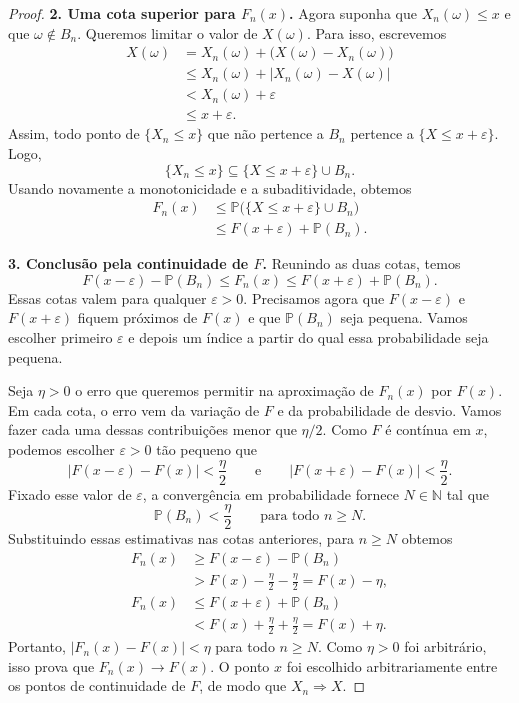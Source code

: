 \documentclass[12pt,portuguese]{article}
\theoremstyle{definition}
\theoremstyle{plainexercise}
\theoremstyle{starredexercise}
\theoremstyle{definition}
\begin{document}
\begin{proof}
\smallskip
\noindent\textbf{2. Uma cota superior para $F_n(x)$.}
Agora suponha que $X_n(\omega)\leqslant x$ e que $\omega\notin B_n$.
Queremos limitar o valor de $X(\omega)$. Para isso, escrevemos
\begin{align*}
X(\omega)
&=X_n(\omega)+\bigl(X(\omega)-X_n(\omega)\bigr)
\\
&\leqslant X_n(\omega)+|X_n(\omega)-X(\omega)|
\\
&<X_n(\omega)+\varepsilon
\\
&\leqslant x+\varepsilon.
\end{align*}
Assim, todo ponto de $\{X_n\leqslant x\}$ que não pertence a $B_n$ pertence a
$\{X\leqslant x+\varepsilon\}$. Logo,
\[
\{X_n\leqslant x\}
\subseteq
\{X\leqslant x+\varepsilon\}\cup B_n.
\]
Usando novamente a monotonicidade e a subaditividade, obtemos
\begin{align*}
F_n(x)
&\leqslant\mathbb{P}\bigl(\{X\leqslant x+\varepsilon\}\cup B_n\bigr)
\\
&\leqslant F(x+\varepsilon)+\mathbb{P}(B_n).
\end{align*}

\smallskip
\noindent\textbf{3. Conclusão pela continuidade de $F$.}
Reunindo as duas cotas, temos
\[
F(x-\varepsilon)-\mathbb{P}(B_n)
\leqslant F_n(x)
\leqslant F(x+\varepsilon)+\mathbb{P}(B_n).
\]
Essas cotas valem para qualquer $\varepsilon>0$. Precisamos agora que
$F(x-\varepsilon)$ e $F(x+\varepsilon)$ fiquem próximos de $F(x)$ e que
$\mathbb{P}(B_n)$ seja pequena. Vamos escolher primeiro $\varepsilon$ e
depois um índice a partir do qual essa probabilidade seja pequena.

Seja $\eta>0$ o erro que queremos permitir na aproximação de $F_n(x)$ por
$F(x)$. Em cada cota, o erro vem da variação de $F$ e da probabilidade de
desvio. Vamos fazer cada uma dessas contribuições menor que $\eta/2$.
Como $F$ é contínua em $x$, podemos escolher $\varepsilon>0$ tão pequeno que
\[
|F(x-\varepsilon)-F(x)|<\frac{\eta}{2}
\qquad\text{e}\qquad
|F(x+\varepsilon)-F(x)|<\frac{\eta}{2}.
\]
Fixado esse valor de $\varepsilon$, a convergência em probabilidade fornece
$N\in\mathbb{N}$ tal que
\[
\mathbb{P}(B_n)<\frac{\eta}{2}
\qquad\text{para todo }n\geqslant N.
\]
Substituindo essas estimativas nas cotas anteriores, para $n\geqslant N$
obtemos
\begin{align*}
F_n(x)
&\geqslant F(x-\varepsilon)-\mathbb{P}(B_n)
\\
&>F(x)-\frac{\eta}{2}-\frac{\eta}{2}=F(x)-\eta,
\\[0.3cm]
F_n(x)
&\leqslant F(x+\varepsilon)+\mathbb{P}(B_n)
\\
&<F(x)+\frac{\eta}{2}+\frac{\eta}{2}=F(x)+\eta.
\end{align*}
Portanto, $|F_n(x)-F(x)|<\eta$ para todo $n\geqslant N$.
Como $\eta>0$ foi arbitrário, isso prova que $F_n(x)\to F(x)$.
O ponto $x$ foi escolhido arbitrariamente entre os pontos de continuidade de
$F$, de modo que $X_n\Rightarrow X$.
\end{proof}
\end{document}
